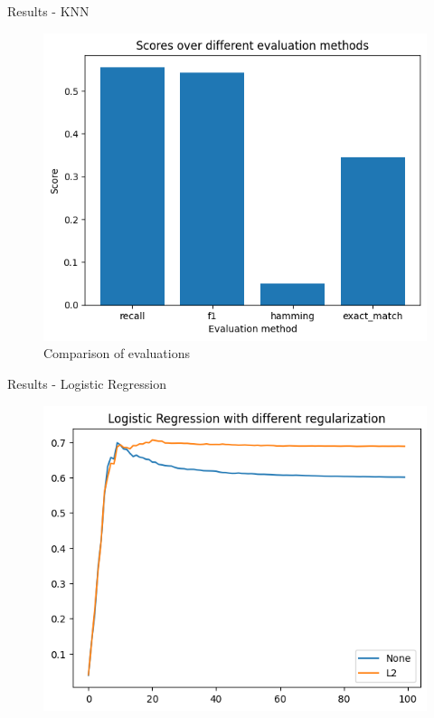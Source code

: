 \documentclass{beamer}
\begin{document}
\begin{frame}[t]{Results - KNN}
\pause
{} {
	\vspace{-3mm}
	\begin{figure}[h]
		\caption{Comparison of evaluations}
		\centering
		\includegraphics[width=0.73\linewidth]{images/KNN/score_every_eval.png}
	\end{figure}
}
\end{frame}


\begin{frame}[t]{Results - Logistic Regression}
	\vspace{-3mm}
	\begin{figure}[h]
		\centering
		\includegraphics[width=0.8\linewidth]{images/LogisticRegression/none_l2_regularization.png}
	\end{figure}
\end{frame}
\end{document}
